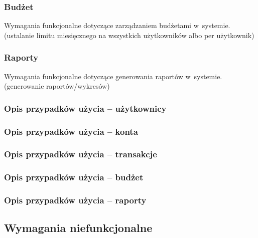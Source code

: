 \subsubsection{Budżet}
Wymagania funkcjonalne dotyczące zarządzaniem budżetami w~systemie.\\
(ustalanie limitu miesięcznego na wszystkich użytkowników albo per użytkownik)

\subsubsection{Raporty}
Wymagania funkcjonalne dotyczące generowania raportów w~systemie.
(generowanie raportów/wykresów)

\subsubsection{Opis przypadków użycia -- użytkownicy}

\subsubsection{Opis przypadków użycia -- konta}

\subsubsection{Opis przypadków użycia -- transakcje}

\subsubsection{Opis przypadków użycia -- budżet}

\subsubsection{Opis przypadków użycia -- raporty}

\subsection{Wymagania niefunkcjonalne}
